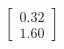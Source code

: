 \documentclass[preview]{standalone}
\begin{document}
\begin{align*}
\begin{bmatrix} 0.32 \\ 1.60 \end{bmatrix}
\end{align*}
\end{document}
